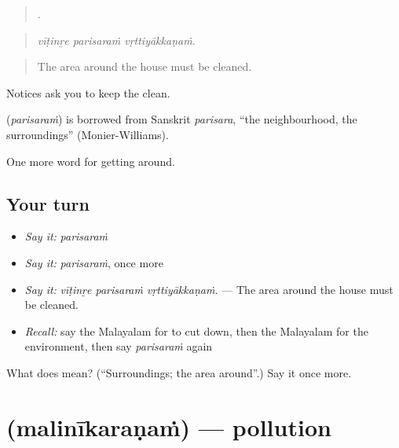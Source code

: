 \begin{quote}
  .
\end{quote}

\begin{quote}
\emph{vīṭinṟe parisaraṁ vṛttiyākkaṇaṁ.}
\end{quote}

\begin{quote}
The area around the house must be cleaned.
\end{quote}

Notices ask you to keep the  clean.

\begin{cousinweb}
\textbf{} (\emph{parisaraṁ}) is borrowed from Sanskrit \emph{parisara}, \textquotedblleft{}the neighbourhood, the surroundings\textquotedblright{} (Monier-Williams).
\end{cousinweb}

\begin{grammarlens}[title={What you've built}]
One more word for getting around.
\end{grammarlens}

\subsection*{Your turn}
\begin{itemize}
\raggedright
  \item \emph{Say it:} \emph{parisaraṁ}
  \item \emph{Say it:} \emph{parisaraṁ}, once more
  \item \emph{Say it:} \emph{vīṭinṟe parisaraṁ vṛttiyākkaṇaṁ.} — The area around the house must be cleaned.
  \item \emph{Recall:} say the Malayalam for to cut down, then the Malayalam for the environment, then say \emph{parisaraṁ} again
\end{itemize}

\begin{tcolorbox}[breakable,colback=teal!4,colframe=teal!35!black,title={Before you move on}]
What does  mean? (\textquotedblleft{}Surroundings; the area around\textquotedblright{}.) Say it once more.
\end{tcolorbox}
\section[\texorpdfstring{\ml{മലിനീകരണം} (malinīkaraṇaṁ)}{മലിനീകരണം (malinīkaraṇaṁ)}]{ (malinīkaraṇaṁ) — pollution}

